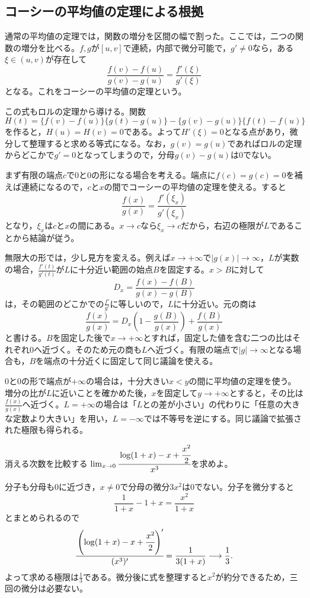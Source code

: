 \subsection{コーシーの平均値の定理による根拠}

通常の平均値の定理では，関数の増分を区間の幅で割った。ここでは，二つの関数の増分を比べる。$f,g$が$[u,v]$で連続，内部で微分可能で，$g'\ne0$なら，ある$\xi\in(u,v)$が存在して
\[
 \frac{f(v)-f(u)}{g(v)-g(u)}=\frac{f'(\xi)}{g'(\xi)}
\]
となる。これをコーシーの平均値の定理という。

この式もロルの定理から導ける。関数
\[
 H(t)=\{f(v)-f(u)\}\{g(t)-g(u)\}
      -\{g(v)-g(u)\}\{f(t)-f(u)\}
\]
を作ると，$H(u)=H(v)=0$である。よって$H'(\xi)=0$となる点があり，微分して整理すると求める等式になる。なお，$g(v)=g(u)$であればロルの定理からどこかで$g'=0$となってしまうので，分母$g(v)-g(u)$は$0$でない。

まず有限の端点$c$で$0$と$0$の形になる場合を考える。端点に$f(c)=g(c)=0$を補えば連続になるので，$c$と$x$の間でコーシーの平均値の定理を使える。すると
\[
 \frac{f(x)}{g(x)}=\frac{f'(\xi_x)}{g'(\xi_x)}
\]
となり，$\xi_x$は$c$と$x$の間にある。$x\to c$なら$\xi_x\to c$だから，右辺の極限が$L$であることから結論が従う。

無限大の形では，少し見方を変える。例えば$x\to+\infty$で$|g(x)|\to\infty$，$L$が実数の場合，$\frac{f'(t)}{g'(t)}$が$L$に十分近い範囲の始点$B$を固定する。$x>B$に対して
\[
 D_x=\frac{f(x)-f(B)}{g(x)-g(B)}
\]
は，その範囲のどこかでの$\frac{f'}{g'}$に等しいので，$L$に十分近い。元の商は
\[
 \frac{f(x)}{g(x)}
 =D_x\left(1-\frac{g(B)}{g(x)}\right)+\frac{f(B)}{g(x)}
\]
と書ける。$B$を固定した後で$x\to+\infty$とすれば，固定した値を含む二つの比はそれぞれ$0$へ近づく。そのため元の商も$L$へ近づく。有限の端点で$|g|\to\infty$となる場合も，$B$を端点の十分近くに固定して同じ議論を使える。

$0$と$0$の形で端点が$+\infty$の場合は，十分大きい$x<y$の間に平均値の定理を使う。増分の比が$L$に近いことを確かめた後，$x$を固定して$y\to+\infty$とすると，その比は$\frac{f(x)}{g(x)}$へ近づく。$L=+\infty$の場合は「$L$との差が小さい」の代わりに「任意の大きな定数より大きい」を用い，$L=-\infty$では不等号を逆にする。同じ議論で拡張された極限も得られる。

\begin{example}{消える次数を比較する}
$\lim_{x\to0}\cfrac{\log(1+x)-x+\cfrac{x^2}{2}}{x^3}$を求めよ。
\end{example}

分子も分母も$0$に近づき，$x\ne0$で分母の微分$3x^2$は$0$でない。分子を微分すると
\[
 \frac1{1+x}-1+x=\frac{x^2}{1+x}
\]
とまとめられるので
\[
 \cfrac{\left(\log(1+x)-x+\cfrac{x^2}{2}\right)'}{(x^3)'}
 =\frac1{3(1+x)}\longrightarrow\frac13.
\]
よって求める極限は$\frac13$である。微分後に式を整理すると$x^2$が約分できるため，三回の微分は必要ない。

